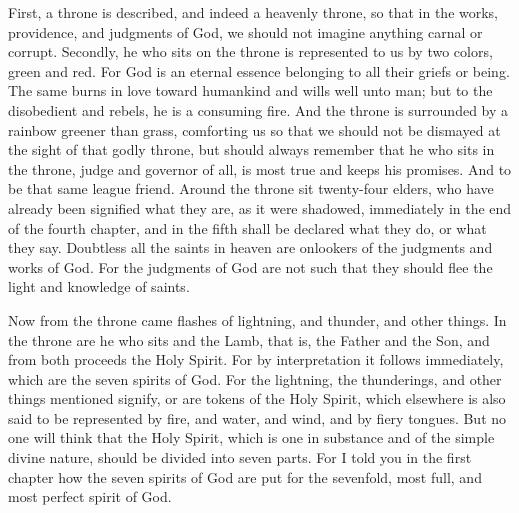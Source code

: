 First, a throne is described, and indeed a heavenly throne, so that in the works, providence, and judgments of God, we should not imagine anything carnal or corrupt. Secondly, he who sits on the throne is represented to us by two colors, green and red. For God is an eternal essence belonging to all their griefs or being. The same burns in love toward humankind and wills well unto man; but to the disobedient and rebels, he is a consuming fire. And the throne is surrounded by a rainbow greener than grass, comforting us so that we should not be dismayed at the sight of that godly throne, but should always remember that he who sits in the throne, judge and governor of all, is most true and keeps his promises. And to be that same league friend. Around the throne sit twenty-four elders, who have already been signified what they are, as it were shadowed, immediately in the end of the fourth chapter, and in the fifth shall be declared what they do, or what they say. Doubtless all the saints in heaven are onlookers of the judgments and works of God. For the judgments of God are not such that they should flee the light and knowledge of saints.

Now from the throne came flashes of lightning, and thunder, and other things. In the throne are he who sits and the Lamb, that is, the Father and the Son, and from both proceeds the Holy Spirit. For by interpretation it follows immediately, which are the seven spirits of God. For the lightning, the thunderings, and other things mentioned signify, or are tokens of the Holy Spirit, which elsewhere is also said to be represented by fire, and water, and wind, and by fiery tongues. But no one will think that the Holy Spirit, which is one in substance and of the simple divine nature, should be divided into seven parts. For I told you in the first chapter how the seven spirits of God are put for the sevenfold, most full, and most perfect spirit of God.

